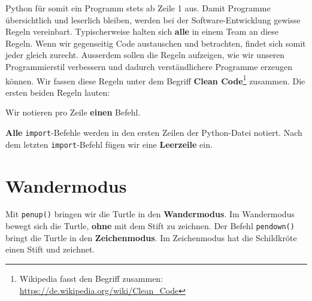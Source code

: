 Python für somit ein Programm stets ab Zeile 1 aus. Damit Programme übersichtlich und leserlich bleiben, werden bei der Software-Entwicklung gewisse Regeln vereinbart. Typischerweise halten sich \textbf{alle} in einem Team an diese Regeln. Wenn wir gegenseitig Code austauschen und betrachten, findet sich somit jeder gleich zurecht. Ausserdem sollen die Regeln aufzeigen, wie wir unseren Programmierstil verbessern und dadurch verständlichere Programme erzeugen können. Wir fassen diese Regeln unter dem Begriff \textbf{Clean Code}\footnote{Wikipedia fasst den Begriff  zusammen: \url{https://de.wikipedia.org/wiki/Clean_Code}} zusammen. Die ersten beiden Regeln lauten:

\begin{cleancode}
Wir notieren pro Zeile \textbf{einen} Befehl.
\end{cleancode}

\begin{cleancode}
\textbf{Alle} \lstinline{import}-Befehle werden in den ersten Zeilen der Python-Datei notiert. Nach dem letzten \lstinline{import}-Befehl fügen wir eine \textbf{Leerzeile} ein.
\end{cleancode}

\section{Wandermodus}

Mit \lstinline{penup()} bringen wir die Turtle in den \textbf{Wandermodus}. Im Wandermodus bewegt sich die Turtle, \textbf{ohne} mit dem Stift zu zeichnen. Der Befehl \lstinline{pendown()} bringt die Turtle in den \textbf{Zeichenmodus}. Im Zeichenmodus hat die Schildkröte einen Stift und zeichnet.

